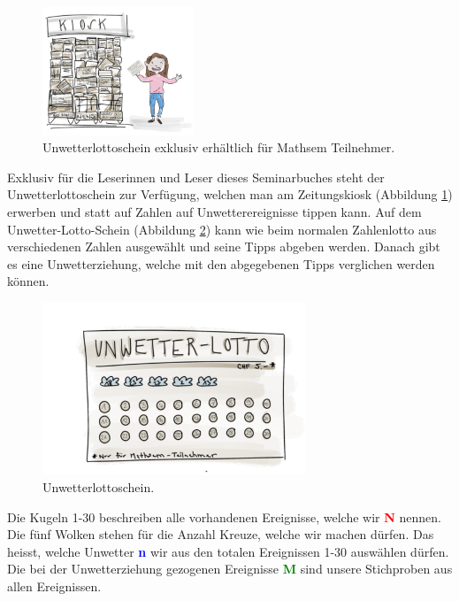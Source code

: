 \begin{refsection}
\begin{figure}[htbp]
\centering
\includegraphics[width=0.4\textwidth]{extrem/Kiosk.pdf}
\caption{Unwetterlottoschein exklusiv erhältlich für Mathsem Teilnehmer.}
\label{Kiosk}
\end{figure}

Exklusiv für die Leserinnen und Leser dieses Seminarbuches steht der Unwetterlottoschein zur Verfügung, welchen man am Zeitungskiosk (Abbildung \ref{Kiosk}) erwerben und statt auf Zahlen auf Unwetterereignisse tippen kann. Auf dem Unwetter-Lotto-Schein (Abbildung \ref{Lottoschein}) kann wie beim normalen Zahlenlotto aus verschiedenen Zahlen ausgewählt und seine Tipps abgeben werden. Danach gibt es eine Unwetterziehung, welche mit den abgegebenen Tipps verglichen werden können.

\begin{figure}[htbp]
\centering
\includegraphics[width=0.7\textwidth]{extrem/Lottoschein.pdf}
\caption{Unwetterlottoschein.}
\label{Lottoschein}
\end{figure}

Die Kugeln 1-30 beschreiben alle vorhandenen Ereignisse, welche wir \textcolor{red}{\textbf{N}} nennen. Die fünf Wolken stehen für die Anzahl Kreuze, welche wir machen dürfen. Das heisst, welche Unwetter \textcolor{blue}{\textbf{n}} wir aus den totalen Ereignissen 1-30 auswählen dürfen. Die bei der Unwetterziehung gezogenen Ereignisse \textcolor{green}{\textbf{M}} sind unsere Stichproben aus allen Ereignissen.


\end{refsection}
